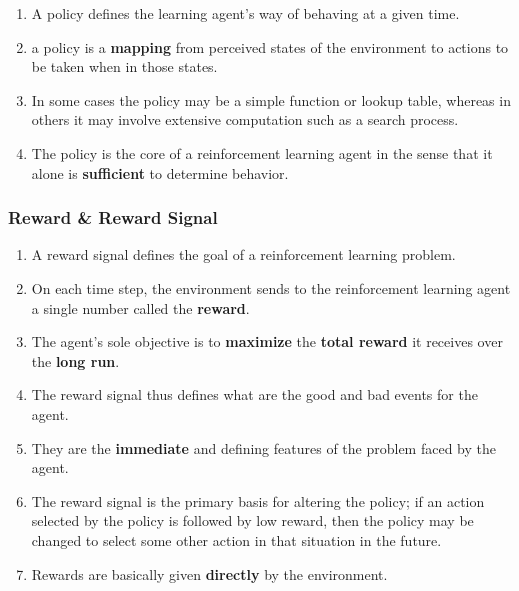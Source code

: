 \begin{enumerate}
    \item A policy defines the learning agent’s way of behaving at a given time. 

    \item a policy is a \textbf{mapping} from perceived states of the environment to actions to be taken when in those states. 

    \item In some cases the policy may be a simple function or lookup table, whereas in others it may involve extensive computation such as a search process. 

    \item The policy is the core of a reinforcement learning agent in the sense that it alone is \textbf{sufficient} to determine behavior.

    
\end{enumerate}


\subsubsection{Reward \& Reward Signal \cite{drl-1}} \label{rl: reward signal}

\begin{enumerate}
    \item A reward signal defines the goal of a reinforcement learning problem.

    \item On each time step, the environment sends to the reinforcement learning agent a single number called the \textbf{reward}.

    \item The agent’s sole objective is to \textbf{maximize} the \textbf{total reward} it receives over the \textbf{long run}. 

    \item The reward signal thus defines what are the good and bad events for the agent.

    \item They are the \textbf{immediate} and defining features of the problem faced by the agent. 
    
    \item The reward signal is the primary basis for altering the policy; if an action selected by the policy is followed by low reward, then the policy may be changed to select some other action in that situation in the future.

    \item Rewards are basically given \textbf{directly} by the environment.

    
\end{enumerate}

